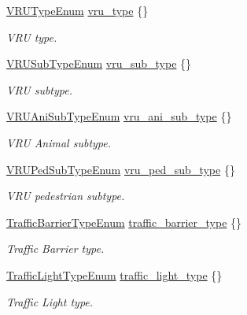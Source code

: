\begin{DoxyCompactItemize}
\hyperlink{structmaf__perception__interface_1_1VRUTypeEnum}{V\+R\+U\+Type\+Enum} \hyperlink{structmaf__perception__interface_1_1ObjectTypeInfo_a98a989089d661f688f6f6c2fcddb1fb1}{vru\+\_\+type} \{\}
\begin{DoxyCompactList}\small\item\em V\+RU type. \end{DoxyCompactList}\item 
\hyperlink{structmaf__perception__interface_1_1VRUSubTypeEnum}{V\+R\+U\+Sub\+Type\+Enum} \hyperlink{structmaf__perception__interface_1_1ObjectTypeInfo_a2a3138acf581cf2ff598ee74db4a3a87}{vru\+\_\+sub\+\_\+type} \{\}
\begin{DoxyCompactList}\small\item\em V\+RU subtype. \end{DoxyCompactList}\item 
\hyperlink{structmaf__perception__interface_1_1VRUAniSubTypeEnum}{V\+R\+U\+Ani\+Sub\+Type\+Enum} \hyperlink{structmaf__perception__interface_1_1ObjectTypeInfo_a8931b2332e246caa44ad8c2cc54cef9b}{vru\+\_\+ani\+\_\+sub\+\_\+type} \{\}
\begin{DoxyCompactList}\small\item\em V\+RU Animal subtype. \end{DoxyCompactList}\item 
\hyperlink{structmaf__perception__interface_1_1VRUPedSubTypeEnum}{V\+R\+U\+Ped\+Sub\+Type\+Enum} \hyperlink{structmaf__perception__interface_1_1ObjectTypeInfo_aad6a5bfc42b47faede4faf49e8b2f22d}{vru\+\_\+ped\+\_\+sub\+\_\+type} \{\}
\begin{DoxyCompactList}\small\item\em V\+RU pedestrian subtype. \end{DoxyCompactList}\item 
\hyperlink{structmaf__perception__interface_1_1TrafficBarrierTypeEnum}{Traffic\+Barrier\+Type\+Enum} \hyperlink{structmaf__perception__interface_1_1ObjectTypeInfo_a7da0c81978243a224d6a832dac39005e}{traffic\+\_\+barrier\+\_\+type} \{\}
\begin{DoxyCompactList}\small\item\em Traffic Barrier type. \end{DoxyCompactList}\item 
\hyperlink{structmaf__perception__interface_1_1TrafficLightTypeEnum}{Traffic\+Light\+Type\+Enum} \hyperlink{structmaf__perception__interface_1_1ObjectTypeInfo_ae5b513ee8d7cbd0d66d54157bcbe4f70}{traffic\+\_\+light\+\_\+type} \{\}
\begin{DoxyCompactList}\small\item\em Traffic Light type. \end{DoxyCompactList}\item 

\end{DoxyCompactItemize}
